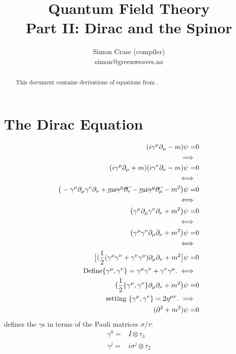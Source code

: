 \documentclass[]{article}
\title{Quantum Field Theory\\
Part II: Dirac and the Spinor}
\author{Simon Crase (compiler)\\simon@greenweaves.nz}
\begin{document}
\maketitle

\begin{abstract}

This document contains derivations of equations from \cite[Part II: Dirac and the Spinor]{zee2010quantum}.

\end{abstract}

\tableofcontents

\section{The Dirac Equation}

\begin{align*}
	(i\gamma^\mu\partial_\mu-m)\psi=&0\\
	\implies&\\
	(i\gamma^\mu\partial_\mu+m)(i\gamma^\nu\partial_\nu-m)\psi=&0 \\
	\iff&\\
	\big(-\gamma^\mu\partial_\mu\gamma^\nu\partial_\nu+\cancel{m i\gamma^\nu\partial_\nu}-\cancel{mi\gamma^\mu\partial_\mu}-m^2\big)\psi=&0\\
	\iff&\\
	\big(\gamma^\mu\partial_\mu\gamma^\nu\partial_\nu+m^2\big)\psi=&0\\
	\iff&\\
	\big(\gamma^\mu\gamma^\nu\partial_\mu\partial_\nu+m^2\big)\psi=&0\\
	\iff&\\
	\big[(\frac{1}{2}(\gamma^\mu\gamma^\nu+\gamma^\nu\gamma^\mu)\partial_\mu\partial_\nu+m^2\big]\psi=&0\\
	\text{Define} \{\gamma^\mu,\gamma^\nu\}=\gamma^\mu\gamma^\nu+\gamma^\nu\gamma^\mu.\iff&\\
	\big(\frac{1}{2}\{\gamma^\mu,\gamma^\nu\}\partial_\mu\partial_\nu+m^2\big)\psi=&0\\
	\text{setting } \{\gamma^\mu,\gamma^\nu\}=2\eta^{\mu\nu}.\implies&\\
	(\partial^2 + m^2)\psi =& 0
\end{align*}
\cite{zee2010quantum} defines the $\gamma$s in terms of the Pauli matrices $\sigma/\tau$:
\begin{align*}
	\gamma^0 =& I \otimes \tau_3\\
	\gamma^j =& i \sigma^j \otimes \tau_2
\end{align*}
\end{document}
